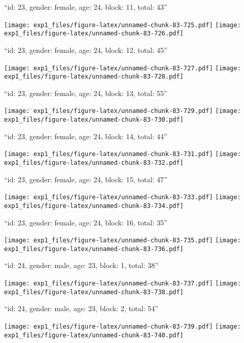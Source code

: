 \documentclass[11pt,,]{article}
\begin{document}
\newpage
[1] 

``id: 23, gender: female, age: 24, block: 11, total: 43''

\texttt{[image: exp1\_files/figure-latex/unnamed-chunk-83-725.pdf]}
\texttt{[image: exp1\_files/figure-latex/unnamed-chunk-83-726.pdf]}

\newpage
[1] 

``id: 23, gender: female, age: 24, block: 12, total: 45''

\texttt{[image: exp1\_files/figure-latex/unnamed-chunk-83-727.pdf]}
\texttt{[image: exp1\_files/figure-latex/unnamed-chunk-83-728.pdf]}

\newpage
[1] 

``id: 23, gender: female, age: 24, block: 13, total: 55''

\texttt{[image: exp1\_files/figure-latex/unnamed-chunk-83-729.pdf]}
\texttt{[image: exp1\_files/figure-latex/unnamed-chunk-83-730.pdf]}

\newpage
[1] 

``id: 23, gender: female, age: 24, block: 14, total: 44''

\texttt{[image: exp1\_files/figure-latex/unnamed-chunk-83-731.pdf]}
\texttt{[image: exp1\_files/figure-latex/unnamed-chunk-83-732.pdf]}

\newpage
[1] 

``id: 23, gender: female, age: 24, block: 15, total: 47''

\texttt{[image: exp1\_files/figure-latex/unnamed-chunk-83-733.pdf]}
\texttt{[image: exp1\_files/figure-latex/unnamed-chunk-83-734.pdf]}

\newpage
[1] 

``id: 23, gender: female, age: 24, block: 16, total: 35''

\texttt{[image: exp1\_files/figure-latex/unnamed-chunk-83-735.pdf]}
\texttt{[image: exp1\_files/figure-latex/unnamed-chunk-83-736.pdf]}

\newpage
[1] 

``id: 24, gender: male, age: 23, block: 1, total: 38''

\texttt{[image: exp1\_files/figure-latex/unnamed-chunk-83-737.pdf]}
\texttt{[image: exp1\_files/figure-latex/unnamed-chunk-83-738.pdf]}

\newpage
[1] 

``id: 24, gender: male, age: 23, block: 2, total: 54''

\texttt{[image: exp1\_files/figure-latex/unnamed-chunk-83-739.pdf]}
\texttt{[image: exp1\_files/figure-latex/unnamed-chunk-83-740.pdf]}
\end{document}
